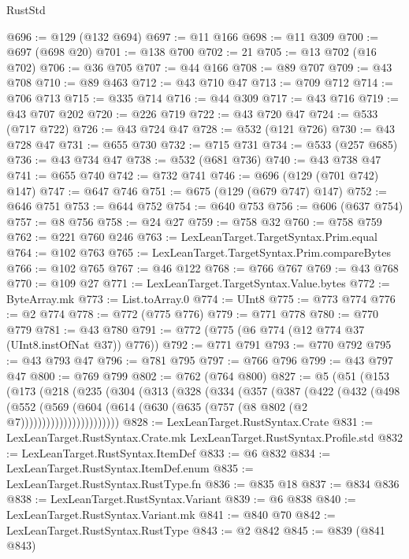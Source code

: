\begin{lexlean}{RustStd}
\begin{coremodule}
@696 := @129 (@132 @694)
@697 := @11 @166
@698 := @11 @309
@700 := @697 (@698 @20)
@701 := @138 @700
@702 := 21
@705 := @13 @702 (@16 @702)
@706 := @36 @705
@707 := @44 @166
@708 := @89 @707
@709 := @43 @708
@710 := @89 @463
@712 := @43 @710 @47
@713 := @709 @712
@714 := @706 @713
@715 := @335 @714
@716 := @44 @309
@717 := @43 @716
@719 := @43 @707 @202
@720 := @226 @719
@722 := @43 @720 @47
@724 := @533 (@717 @722)
@726 := @43 @724 @47
@728 := @532 (@121 @726)
@730 := @43 @728 @47
@731 := @655 @730
@732 := @715 @731
@734 := @533 (@257 @685)
@736 := @43 @734 @47
@738 := @532 (@681 @736)
@740 := @43 @738 @47
@741 := @655 @740
@742 := @732 @741
@746 := @696 (@129 (@701 @742) @147)
@747 := @647 @746
@751 := @675 (@129 (@679 @747) @147)
@752 := @646 @751
@753 := @644 @752
@754 := @640 @753
@756 := @606 (@637 @754)
@757 := @8 @756
@758 := @24 @27
@759 := @758 @32
@760 := @758 @759
@762 := @221 @760 @246
@763 := LexLeanTarget.TargetSyntax.Prim.equal
@764 := @102 @763
@765 := LexLeanTarget.TargetSyntax.Prim.compareBytes
@766 := @102 @765
@767 := @46 @122
@768 := @766 @767
@769 := @43 @768
@770 := @109 @27
@771 := LexLeanTarget.TargetSyntax.Value.bytes
@772 := ByteArray.mk
@773 := List.toArray.{0}
@774 := UInt8
@775 := @773 @774
@776 := @2 @774
@778 := @772 (@775 @776)
@779 := @771 @778
@780 := @770 @779
@781 := @43 @780
@791 := @772 (@775 (@6 @774 (@12 @774 @37 (UInt8.instOfNat @37)) @776))
@792 := @771 @791
@793 := @770 @792
@795 := @43 @793 @47
@796 := @781 @795
@797 := @766 @796
@799 := @43 @797 @47
@800 := @769 @799
@802 := @762 (@764 @800)
@827 := @5
    (@51
      (@153
        (@173
          (@218
            (@235
              (@304
                (@313
                  (@328
                    (@334
                      (@357
                        (@387
                          (@422
                            (@432
                              (@498
                                (@552
                                  (@569
                                    (@604
                                      (@614 (@630 (@635 (@757 (@8 @802 (@2 @7)))))))))))))))))))))))
@828 := LexLeanTarget.RustSyntax.Crate
@831 := LexLeanTarget.RustSyntax.Crate.mk LexLeanTarget.RustSyntax.Profile.std
@832 := LexLeanTarget.RustSyntax.ItemDef
@833 := @6 @832
@834 := LexLeanTarget.RustSyntax.ItemDef.enum
@835 := LexLeanTarget.RustSyntax.RustType.fn
@836 := @835 @18
@837 := @834 @836
@838 := LexLeanTarget.RustSyntax.Variant
@839 := @6 @838
@840 := LexLeanTarget.RustSyntax.Variant.mk
@841 := @840 @70
@842 := LexLeanTarget.RustSyntax.RustType
@843 := @2 @842
@845 := @839 (@841 @843)

\end{coremodule}
\end{lexlean}
